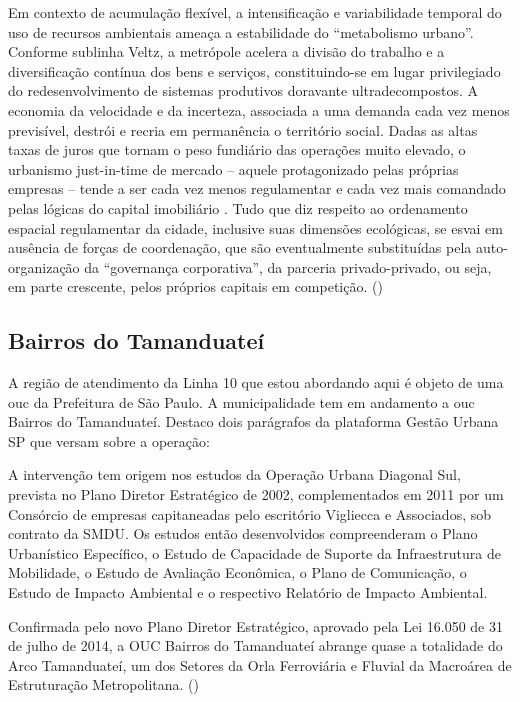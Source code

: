 \documentclass[11pt,fleqn]{book} %
\begin{document}
\begin{citacao}
	Em contexto de acumulação flexível, a intensificação e variabilidade temporal do uso de recursos ambientais ameaça a estabilidade do “metabolismo urbano”. Conforme sublinha Veltz, a metrópole acelera a divisão do trabalho e a diversificação contínua dos bens e serviços, constituindo-se em lugar privilegiado do redesenvolvimento de sistemas produtivos doravante ultradecompostos. A economia da velocidade e da incerteza, associada a uma demanda cada vez menos previsível, destrói e recria em permanência o território social. Dadas as altas taxas de juros que tornam o peso fundiário das operações muito elevado, o urbanismo just-in-time de mercado – aquele protagonizado pelas próprias empresas – tende a ser cada vez menos regulamentar e cada vez mais comandado pelas	lógicas do capital imobiliário \cite{Acselrad}. Tudo que diz respeito ao ordenamento espacial regulamentar da cidade, inclusive suas dimensões ecológicas, se esvai em ausência de forças de coordenação, que são eventualmente substituídas pela auto-organização da	“governança corporativa”, da parceria privado-privado, ou seja, em parte crescente, pelos próprios capitais em competição.
	(\cite[p. 31]{Acselrad})
\end{citacao}

\subsection{Bairros do Tamanduateí}

A região de atendimento da Linha 10 que estou abordando aqui é objeto de uma \gls{ouc} da Prefeitura de São Paulo. A municipalidade tem em andamento a \gls{ouc} Bairros do Tamanduateí. Destaco dois parágrafos da plataforma Gestão Urbana SP que versam sobre a operação:

\begin{citacao}
	A intervenção tem origem nos estudos da Operação Urbana Diagonal Sul, prevista no Plano Diretor Estratégico de 2002, complementados em 2011 por um Consórcio de empresas capitaneadas pelo escritório Vigliecca e Associados, sob contrato da SMDU. Os estudos então desenvolvidos compreenderam o Plano Urbanístico Específico, o Estudo de Capacidade de Suporte da Infraestrutura de Mobilidade, o Estudo de Avaliação Econômica, o Plano de Comunicação, o Estudo de Impacto Ambiental e o respectivo Relatório de Impacto Ambiental.
	
	Confirmada pelo novo Plano Diretor Estratégico, aprovado pela Lei 16.050 de 31 de julho de 2014, a OUC Bairros do Tamanduateí abrange quase a totalidade do Arco Tamanduateí, um dos Setores da Orla Ferroviária e Fluvial da Macroárea de Estruturação Metropolitana.
	(\cite{smdu})
\end{citacao}
\end{document}
